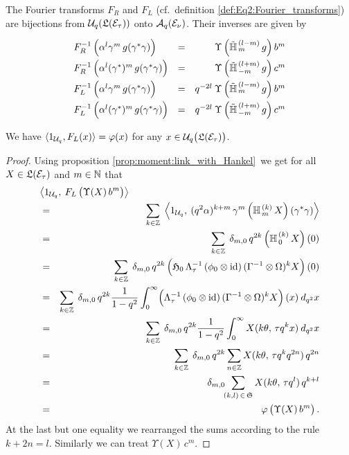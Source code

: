 \begin{prop}  \label{prop:Eq2:Fourier:bijections}
The Fourier transforms $F_R$ and $F_L$
(cf.\ definition \ref{def:Eq2:Fourier_transforms}) are bijections from
${\mathcal U}_q\!\left(\mathfrak{L}(\mathcal E_\tau)\right)$ onto ${\mathcal A}_q(\mathcal E_\nu)$.
Their inverses are given by
$$\begin{array}{lcr}
F_R^{-1} \left(  \alpha^l \gamma^m \,g(\gamma^*\gamma) \vertL \right)
&=&
\Upsilon \left(\Htil{m}{l-m}\,g \right) b^m   \vertXL
\\
F_R^{-1} \left(  \alpha^l (\gamma^*)^m \,g(\gamma^*\gamma) \vertL \right)
&=&
\Upsilon \left(\Htil{-m}{l+m}\,g \right) c^m  \vertXL
\\
F_L^{-1} \left(  \alpha^l \gamma^m \,g(\gamma^*\gamma) \vertL \right)
&=&
q^{-2l} \: \Upsilon \left(\Htil{m}{l-m}\,g \right) b^m  \vertXL
\\
F_L^{-1} \left(  \alpha^l (\gamma^*)^m \,g(\gamma^*\gamma) \vertL \right)
&=&
q^{-2l} \: \Upsilon \left(\Htil{-m}{l+m}\,g \right) c^m  \vertXL
\end{array} $$
\end{prop}


\begin{lemma} \label{lemma:Eq2:lambdaiszeta}
We have $\langle 1_{{\mathcal U}_q},F_{L}(x) \rangle = \varphi(x)$
for any $x\in \Uq\!\left(\calL(\Hcore_\tau)\vertM\right)$.
\end{lemma}
\begin{proof}
Using proposition \ref{prop:moment:link_with_Hankel}\ we get for
all $X\in \mathfrak{L}(\mathcal E_\tau)$ and $m\in \mathbb{N}$ that
\begin{eqnarray*}
\lefteqn{ \left\langle 1_{\Uq} ,\: F_L\left(\vertM\Upsilon(X)\, b^m\right)
          \right\rangle}\\
&=&
\sum_{k\in\ZZ} \;  \left\langle 1_{\Uq} ,\: (q^2 \alpha)^{k+m}\, \gamma^m
               \left(\YaH{m}{k}\,X\right)(\gamma^*\gamma) \right\rangle \\
&=&
\sum_{k\in\ZZ} \; \delta_{m,0} \, q^{2k} \left(\YaH{0}{k}\,X\right)(0) \\
&=&
\sum_{k\in\ZZ} \; \delta_{m,0} \, q^{2k} \left(\holH{0} \, \Lambda_\tau^{-1}\,
         (\evzero \tens \id)\,(\Gamma^{-1} \tens \Omega)^k X \vertL\right)(0) \\
&=&
\sum_{k\in\ZZ} \; \delta_{m,0} \, q^{2k}  \frac{1}{1-q^2} \int_0^\infty
     \! \left(\Lambda_\tau^{-1}\, (\evzero \tens \id)\,
           (\Gamma^{-1} \tens \Omega)^k X \vertL\right)(x) \: d_{q^2}x  \\
&=&
\sum_{k\in\ZZ} \; \delta_{m,0} \, q^{2k}  \frac{1}{1-q^2} \int_0^\infty
      X(k\theta,\, \tau q^k x) \: d_{q^2}x  \\
&=&
\sum_{k\in\ZZ} \; \delta_{m,0} \, q^{2k}
        \sum_{n\in\ZZ}   X(k\theta,\, \tau q^k q^{2n}) \, q^{2n}  \\
&=&
\delta_{m,0} \!\! \sum_{(k,l)\, \in \,\mathfrak{S}}
         X(k\theta,\, \tau q^l) \, q^{k+l}  \\
&=& \varphi\left(\vertM\Upsilon(X)\, b^m\right).
\end{eqnarray*}
At the last but one equality we rearranged the sums according to the rule $k+2n=l$.
Similarly we can treat $\Upsilon(X)\, c^m$.
\end{proof}
\vspace{2ex}

